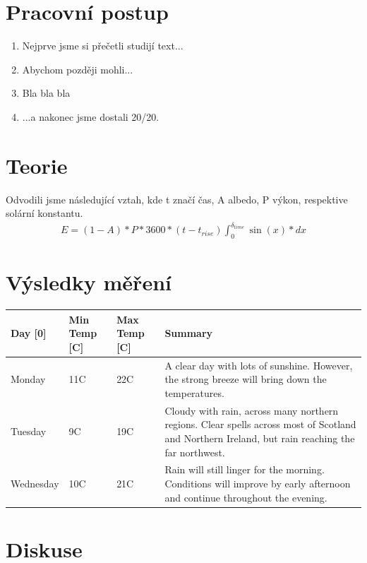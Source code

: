 \documentclass{article}
\author{"Patrik Novotný"}
\begin{document}
\section*{Pracovní postup}
\begin{enumerate}[label=(\alph*)]
\item Nejprve jsme si přečetli studijí text...
\item Abychom později mohli...
\item Bla bla bla
\item ...a nakonec jsme dostali 20/20.
\end{enumerate}


\section*{Teorie}
\par Odvodili jsme následující vztah, kde t značí čas, A albedo, P výkon, respektive solární konstantu.
\begin{align}
E =(1-A)*P*3600*(t-t_{rise}) \int_{0}^{\delta_{time}} \sin(x)*dx
\end{align}
\section*{Výsledky měření}
\begin{center}
     \label{tab:title} 
    \begin{tabular}{ | l | l | l | p{5cm} |}
    \hline
    Day [0] & Min Temp [C] & Max Temp [C] & Summary \\ \hline
    Monday & 11C & 22C & A clear day with lots of sunshine.  
    However, the strong breeze will bring down the temperatures. \\ \hline
    Tuesday & 9C & 19C & Cloudy with rain, across many northern regions. Clear spells 
    across most of Scotland and Northern Ireland, 
    but rain reaching the far northwest. \\ \hline
    Wednesday & 10C & 21C & Rain will still linger for the morning. 
    Conditions will improve by early afternoon and continue 
    throughout the evening. \\
    \hline
    \end{tabular}
\end{center}

\section*{Diskuse}
\end{document}

